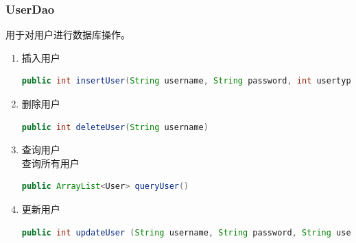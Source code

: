 \documentclass[../report.tex]{subfiles}
\begin{document}
\subsubsection{UserDao}
用于对用户进行数据库操作。
\begin{enumerate}
\itemsep 0em
\item 插入用户\\
\begin{lstlisting}[language=java,backgroundcolor=\color{lightgray}]
public int insertUser(String username, String password, int usertype, String foreign_id)
\end{lstlisting}
\item 删除用户\\
\begin{lstlisting}[language=java,backgroundcolor=\color{lightgray}]
public int deleteUser(String username)
\end{lstlisting}
\item 查询用户\\
查询所有用户\\
\begin{lstlisting}[language=java,backgroundcolor=\color{lightgray}]
public ArrayList<User> queryUser()
\end{lstlisting}
\item 更新用户\\
\begin{lstlisting}[language=java,backgroundcolor=\color{lightgray}]
public int updateUser (String username, String password, String usertype_string, String foreign_id)
\end{lstlisting}
\end{enumerate}
\end{document}
